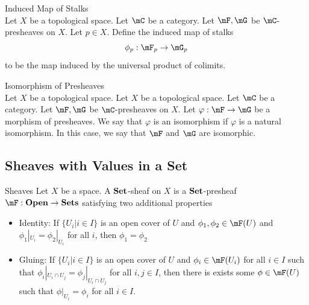\documentclass[a4paper]{article}
\begin{document}
\begin{defn}{Induced Map of Stalks}{}\\
Let $X$ be a topological space. Let $\mC$ be a category. Let $\mF,\mG$ be $\mC$-presheaves on $X$. Let $p\in X$. Define the induced map of stalks $$\phi_p:\mF_p\to\mG_p$$ to be the map induced by the universal product of colimits. 
\end{defn}

\begin{defn}{Isomorphism of Presheaves}{}\\
Let $X$ be a topological space. Let $X$ be a topological space. Let $\mC$ be a category. Let $\mF,\mG$ be $\mC$-presheaves on $X$. Let $\varphi:\mF\to\mG$ be a morphism of presheaves. We say that $\varphi$ is an isomorphism if $\varphi$ is a natural isomorphism. In this case, we say that $\mF$ and $\mG$ are isomorphic. 
\end{defn}

\subsection{Sheaves with Values in a Set}
\begin{defn}{Sheaves}{} Let $X$ be a space. A $\bold{Set}$-sheaf on $X$ is a $\bold{Set}$-presheaf $\mF:\bold{Open}\to\bold{Sets}$ satisfying two additional properties
\begin{itemize}
\item Identity: If $\{U_i|i\in I\}$ is an open cover of $U$ and $\phi_1,\phi_2\in\mF(U)$ and $\phi_1|_{U_i}=\phi_2|_{U_i}$ for all $i$, then $\phi_1=\phi_2$
\item Gluing: If $\{U_i|i\in I\}$ is an open cover of $U$ and $\phi_i\in\mF(U_i)$ for all $i\in I$ such that $\phi_i|_{U_i\cap U_j}=\phi_j|_{U_i\cap U_j}$ for all $i,j\in I$, then there is exists some $\phi\in\mF(U)$ such that $\phi|_{U_i}=\phi_i$ for all $i\in I$. 
\end{itemize}
\end{defn}
\end{document}
